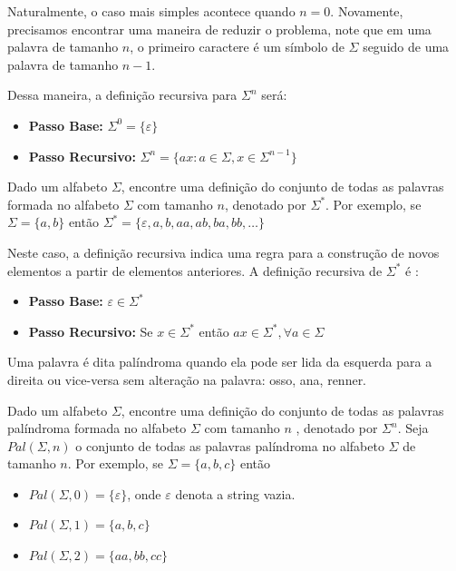 Naturalmente, o caso mais simples acontece quando $n = 0$. Novamente, precisamos encontrar uma maneira de reduzir o problema, note que em uma palavra de tamanho $n$, o primeiro caractere é um símbolo de $\Sigma$ seguido de uma palavra de tamanho $n-1$.


Dessa maneira, a definição recursiva para $\Sigma^n$ será:

\begin{itemize}
    \item \textbf{Passo Base:} $\Sigma^0 = \{ \varepsilon\}$
    
    \item \textbf{Passo Recursivo:} $\Sigma^n = \{ ax : a \in \Sigma, x \in \Sigma^{n-1}\}$
\end{itemize}


\begin{exemplo}
Dado um alfabeto $\Sigma$, encontre uma definição do conjunto de todas as palavras formada no alfabeto $\Sigma$ com tamanho $n$, denotado por $\Sigma^*$. Por exemplo, se $\Sigma = \{a,b\}$ então $\Sigma^* = \{\varepsilon,a,b,aa,ab,ba,bb,\ldots\}$
\end{exemplo}

Neste caso, a definição recursiva indica uma regra para a construção de novos elementos a partir de elementos anteriores. A definição recursiva de $\Sigma^*$ é :

\begin{itemize}
    \item \textbf{Passo Base:} $\varepsilon \in \Sigma^*$
    
    \item \textbf{Passo Recursivo:} Se $x \in \Sigma^*$ então $ax \in \Sigma^*, \forall a \in \Sigma$ 
\end{itemize}



\begin{exemplo}
Uma palavra é dita palíndroma quando ela pode ser lida da esquerda para a direita ou vice-versa sem alteração na palavra: osso, ana, renner.

Dado um alfabeto $\Sigma$, encontre uma definição do conjunto de todas as palavras palíndroma formada no alfabeto $\Sigma$ com tamanho $n$ , denotado por $\Sigma^n$. Seja $Pal(\Sigma, n)$ o conjunto de todas as palavras palíndroma no alfabeto $\Sigma$ de tamanho $n$. Por exemplo, se $\Sigma = \{a,b,c\}$ então

\begin{itemize}
    \item $Pal(\Sigma, 0) = \{ \varepsilon \}$, onde $\varepsilon$ denota a string vazia.
    \item $Pal(\Sigma, 1) = \{ a,b,c \}$
    
    \item $Pal(\Sigma,2) = \{ aa,bb,cc \}$
    
\end{itemize}

\end{exemplo}
 


